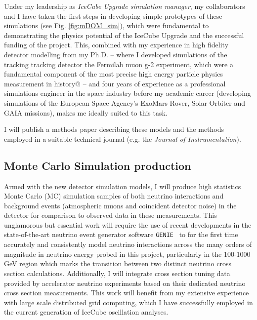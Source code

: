 \documentclass[a4paper,11pt]{article}
\begin{document}
Under my leadership as \textit{IceCube Upgrade simulation manager}, my collaborators and I have taken the first steps in developing simple prototypes of these simulations (see Fig. \ref{fig:mDOM_sim}), which were fundamental to demonstrating the physics potential of the IceCube Upgrade and the successful funding of the project. This, combined with my experience in high fidelity detector modelling from my Ph.D. -- where I developed simulations of the tracking tracking detector the Fermilab muon g-2 experiment, which were a fundamental component of the most precise high energy particle physics measurement in history@\cite{gm2_run1_result} -- and four years of experience as a professional simulations engineer in the space industry before my academic career (developing simulations of the European Space Agency's ExoMars Rover, Solar Orbiter and GAIA missions), makes me ideally suited to this task. 

I will publish a methods paper describing these models and the methods employed in a suitable technical journal (e.g. the \textit{Journal of Instrumentation}). \\


\subsection{Monte Carlo Simulation production}

Armed with the new detector simulation models, I will produce high statistics Monte Carlo (MC) simulation samples of both neutrino interactions and background events (atmospheric muons and coincident detector noise) in the detector for comparison to observed data in these measurements. This unglamorous but essential work will require the use of recent developments in the state-of-the-art neutrino event generator software \texttt{GENIE}~\cite{Andreopoulos:2009zz, Garcia:2019hze} to for the first time accurately and consistently model neutrino interactions across the many orders of magnitude in neutrino energy probed in this project, particularly in the 100-1000 GeV region which marks the transition between two distinct neutrino cross section calculations. Additionally, I will integrate cross section tuning data provided by accelerator neutrino experiments based on their dedicated neutrino cross section measurements. This work will benefit from my extensive experience with large scale distributed grid computing, which I have successfully employed in the current generation of IceCube oscillation analyses.
\end{document}
